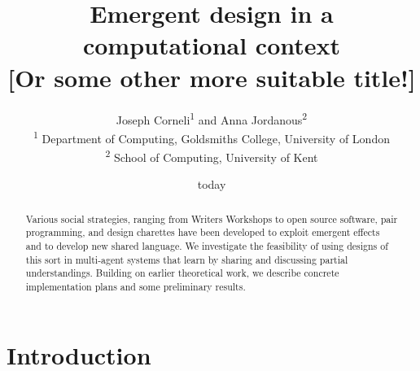 \documentclass{article}
\begin{document}
\title{Emergent design in a computational context\\
{\small{[}Or some other more suitable title!{]}}}

\author{Joseph Corneli\textsuperscript{1} and Anna Jordanous\textsuperscript{2}\\
\textsuperscript{1} Department of Computing, Goldsmiths College, University of London\\
\textsuperscript{2} School of Computing, University of Kent}

\date{today}

\maketitle

\begin{abstract} 
Various social strategies, ranging from Writers Workshops to open
source software, pair programming, and design charettes have been
developed to exploit emergent effects and to develop new shared
language.  We investigate the feasibility of using designs of this
sort in multi-agent systems that learn by sharing and discussing
partial understandings.  Building on earlier theoretical work, we
describe concrete implementation plans and some preliminary results.
%
\end{abstract}

\section{Introduction} \label{sec:introduction}

%
%
%
\end{document}
